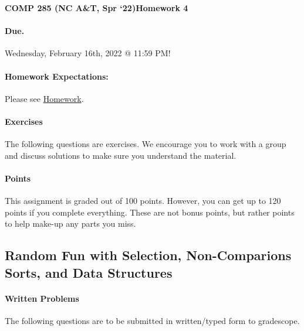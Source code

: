 \documentclass [12pt]{article}
\begin{document}
 

{\LARGE \textbf {COMP 285 (NC A\&T, Spr `22)}\hfill \textbf {Homework 4} } 
\vspace {1em} 
\begin {Instruction} 

\paragraph {Due.} Wednesday, February 16th, 2022 @ 11:59 PM!
\end {Instruction} 

\vspace {1em} 
\begin {Instruction} \paragraph {Homework Expectations:} Please see \href{https://www.comp285-fall22.ml/homework/#general-homework-information}{Homework}.
\end {Instruction}

\vspace {1em} 
\begin {Instruction} 

\paragraph {Exercises} The following questions are exercises. We encourage you to work with a group and discuss solutions to make sure you understand the material.

\paragraph {Points} This assignment is graded out of 100 points. However, you can get up to 120 points if you complete everything. These are not bonus points, but rather points to help make-up any parts you miss.

\end {Instruction} 

\begin{centering}
\section*{Random Fun with Selection, Non-Comparions Sorts, and Data Structures}
\end{centering}

\begin{Instruction}

\paragraph{Written Problems} The following questions are to be submitted in written/typed form to gradescope.

\end{Instruction}
\end{document}
